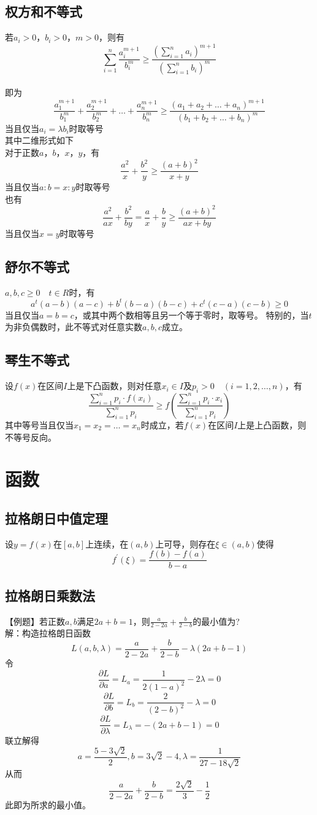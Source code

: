\documentclass[UTF8]{ctexart}
\begin{document}
		\subsection{权方和不等式}
			若$a_i>0$，$b_i>0$，$m>0$，则有
			\[\sum\limits_{i=1}^{n}\frac{a_i^{m+1}}{b_i^{m}}\geq \frac{\left (\sum\limits_{i=1}^{n}a_i\right) ^{m+1}}{\left (\sum\limits_{i=1}^{n}b_i\right) ^m}\] \\
			即为
			\[\frac{a_1^{m+1}}{b_1^{m}}+\frac{a_2^{m+1}}{b_2^{m}}+\dots+\frac{a_n^{m+1}}{b_n^{m}}\geq \frac{(a_1+a_2+\dots+a_n)^{m+1}}{(b_1+b_2+\dots+b_n)^{m}}\]
			当且仅当$a_i=\lambda b_i$时取等号 \\
			其中二维形式如下\\
			对于正数$a$，$b$，$x$，$y$，有
			\[\frac{a^2}{x}+\frac{b^2}{y}\geq \frac{(a+b)^2}{x+y}\]
			当且仅当$a:b=x:y$时取等号\\
			也有
			\[\frac{a^2}{ax}+\frac{b^2}{by}=\frac{a}{x}+\frac{b}{y}\geq \frac{(a+b)^2}{ax+by}\]
			当且仅当$x=y$时取等号
		\subsection{舒尔不等式}
			$a,b,c\geq 0\quad t\in R$时，有
			\[a^t (a-b)(a-c)+b^t (b-a)(b-c)+c^t (c-a)(c-b)\geq 0\]
			当且仅当$a=b=c$，或其中两个数相等且另一个等于零时，取等号。
			特别的，当$t$为非负偶数时，此不等式对任意实数$a,b,c$成立。
		\subsection{琴生不等式}
			设$f(x)$在区间$I$上是下凸函数，则对任意$x_i\in I$及$p_i>0\quad (i=1,2,\dots,n)$，有
			\[ \frac{\sum\limits_{i=1}^{n}p_i\cdot f(x_i)}{\sum\limits_{i=1}^{n}p_i}\geq f \left (\frac{\sum\limits_{i=1}^{n}p_i\cdot x_i}{\sum\limits_{i=1}^{n}p_i} \right ) \]
			其中等号当且仅当$x_1=x_2=\dots=x_n$时成立，若$f(x)$在区间$I$上是上凸函数，则不等号反向。
	\section{函数}
		\subsection{拉格朗日中值定理}
			设$y=f(x)$在$[a,b]$上连续，在$(a,b)$上可导，则存在$\xi \in (a,b)$使得
			\[f^{'}(\xi)=\frac{f(b)-f(a)}{b-a}\]
		\subsection{拉格朗日乘数法}
			【例题】若正数$a,b$满足$2a+b=1$，则$\frac{a}{2-2a}+\frac{b}{2-b}$的最小值为?\\
			解：构造拉格朗日函数
			\[L(a,b,\lambda)=\frac{a}{2-2a}+\frac{b}{2-b}-\lambda(2a+b-1)\]
			令
			\[\frac{\partial L}{\partial a}=L_a=\frac{1}{2(1-a)^2}-2\lambda=0\]
			\[\frac{\partial L}{\partial b}=L_b=\frac{2}{(2-b)^2}-\lambda=0\]
			\[\frac{\partial L}{\partial \lambda}=L_\lambda=-(2a+b-1)=0\]
			联立解得
			\[a=\frac{5-3\sqrt{2}}{2},b=3\sqrt{2}-4,\lambda=\frac{1}{27-18\sqrt{2}}\]
			从而
			\[\frac{a}{2-2a}+\frac{b}{2-b}=\frac{2\sqrt{2}}{3}-\frac{1}{2}\]
			此即为所求的最小值。
\end{document}
